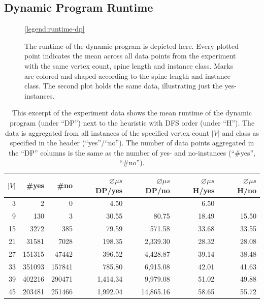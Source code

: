 \subsection{Dynamic Program Runtime}

\begin{figure}
    \centering %
    \scalebox{1}{}
    \scalebox{1}{}
    \ref{legend:runtime-dp}
    \caption{The runtime of the dynamic program is depicted here. Every plotted point indicates the mean across all data points from the experiment with the same vertex count, spine length and instance class. Marks are colored and shaped according to the spine length and instance class. The second plot holds the same data, illustrating just the yes-instances.}
    \label{fig:ch5_runtime_dp}
\end{figure}

\begin{table}[t]
\centering
\begin{tabular}{ r|r|r|r|r|r|r }
\toprule
 $|V|$ & \#yes & \#no & $\varnothing \mu s$ DP/yes & $\varnothing \mu s$ DP/no & $\varnothing \mu s$ H/yes & $\varnothing \mu s$ H/no \\
 \hline
3	& 2 		& 0     	& 4.50		& 			& 6.50	&       \\
9	& 130		& 3     	& 30.55		& 80.75		& 18.49	& 15.50 \\
15	& 3272		& 385   	& 79.59		& 571.58	& 33.68	& 33.55 \\
21	& 31581		& 7028  	& 198.35	& 2,339.30	& 28.32	& 28.08 \\
27	& 151315	& 47442		& 396.52	& 4,428.87	& 39.14	& 38.48 \\
33	& 351093	& 157841	& 785.80	& 6,915.08	& 42.01	& 41.63 \\
39	& 402216	& 290471	& 1,414.34	& 9,979.08	& 51.02	& 49.88 \\
45	& 203481	& 251466	& 1,992.04	& 14,865.16	& 58.65	& 55.72 \\
\bottomrule
\end{tabular}
\caption{This excerpt of the experiment data shows the mean runtime of the dynamic program (under ``DP'') next to the heuristic with DFS order (under ``H''). The data is aggregated from all instances of the specified vertex count $|V|$ and class as specified in the header (``yes''/``no''). The number of data points aggregated in the ``DP'' columns is the same as the number of yes- and no-instances (``\#yes'', ``\#no'').}
\label{tbl:runtime}
\end{table}

